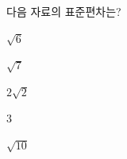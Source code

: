 다음 자료의 표준편차는?
\begin{choices32}{\rule[-3ex]{0pt}{8ex}$\sqrt{6}$}{\rule[-3ex]{0pt}{8ex}$\sqrt{7}$}{\rule[-3ex]{0pt}{8ex}$2\sqrt{2}$}{\rule[-3ex]{0pt}{8ex}$3$}{\rule[-3ex]{0pt}{8ex}$\sqrt{10}$}\end{choices32}
